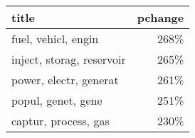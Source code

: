 \begin{tabular}{p{1.2cm}r}
\toprule
                     title &  pchange \\
\midrule
       fuel, vehicl, engin &     268\% \\
 inject, storag, reservoir &     265\% \\
    power, electr, generat &     261\% \\
        popul, genet, gene &     251\% \\
      captur, process, gas &     230\% \\
\bottomrule
\end{tabular}
